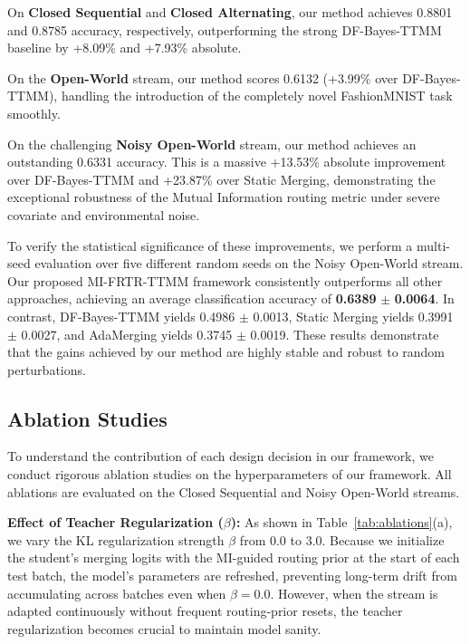 \documentclass{article}
\theoremstyle{plain}
\theoremstyle{definition}
\theoremstyle{remark}
\begin{document}
On \textbf{Closed Sequential} and \textbf{Closed Alternating}, our method achieves 0.8801 and 0.8785 accuracy, respectively, outperforming the strong DF-Bayes-TTMM baseline by +8.09\% and +7.93\% absolute.

On the \textbf{Open-World} stream, our method scores 0.6132 (+3.99\% over DF-Bayes-TTMM), handling the introduction of the completely novel FashionMNIST task smoothly.

On the challenging \textbf{Noisy Open-World} stream, our method achieves an outstanding 0.6331 accuracy. This is a massive +13.53\% absolute improvement over DF-Bayes-TTMM and +23.87\% over Static Merging, demonstrating the exceptional robustness of the Mutual Information routing metric under severe covariate and environmental noise.

To verify the statistical significance of these improvements, we perform a multi-seed evaluation over five different random seeds on the Noisy Open-World stream. Our proposed MI-FRTR-TTMM framework consistently outperforms all other approaches, achieving an average classification accuracy of \textbf{0.6389} $\pm$ \textbf{0.0064}. In contrast, DF-Bayes-TTMM yields 0.4986 $\pm$ 0.0013, Static Merging yields 0.3991 $\pm$ 0.0027, and AdaMerging yields 0.3745 $\pm$ 0.0019. These results demonstrate that the gains achieved by our method are highly stable and robust to random perturbations.

\subsection{Ablation Studies}
\label{sec:ablation_studies}

To understand the contribution of each design decision in our framework, we conduct rigorous ablation studies on the hyperparameters of our framework. All ablations are evaluated on the Closed Sequential and Noisy Open-World streams.

\textbf{Effect of Teacher Regularization ($\beta$):} 
As shown in Table~\ref{tab:ablations}(a), we vary the KL regularization strength $\beta$ from $0.0$ to $3.0$. Because we initialize the student's merging logits with the MI-guided routing prior at the start of each test batch, the model's parameters are refreshed, preventing long-term drift from accumulating across batches even when $\beta=0.0$. However, when the stream is adapted continuously without frequent routing-prior resets, the teacher regularization becomes crucial to maintain model sanity.
\end{document}
